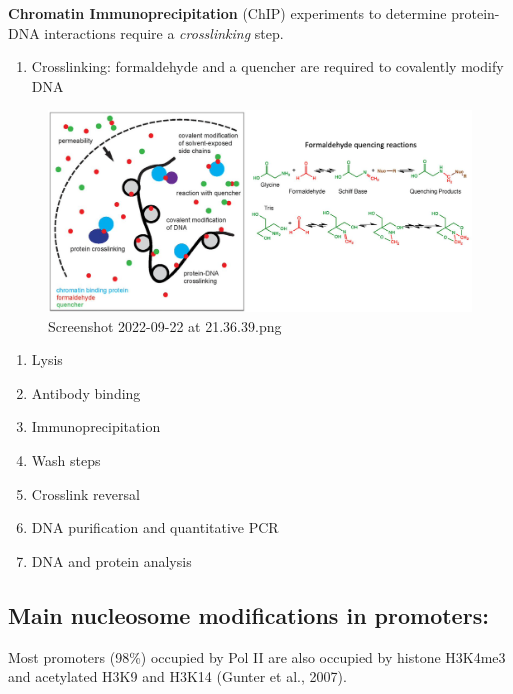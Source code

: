 \textbf{Chromatin Immunoprecipitation} (ChIP) experiments to determine protein-DNA interactions require a \emph{crosslinking} step.

\begin{enumerate}
\def\labelenumi{\arabic{enumi}.}
\tightlist
\item
  Crosslinking: formaldehyde and a quencher are required to covalently modify DNA
\end{enumerate}

\begin{figure}
\centering
\includegraphics[width=\textwidth]{../_resources/Screenshot_2022-09-22_at_21-36-39.png}
\caption{Screenshot 2022-09-22 at 21.36.39.png}
\end{figure}

\begin{enumerate}
\def\labelenumi{\arabic{enumi}.}
\tightlist
\item
  Lysis
\item
  Antibody binding
\item
  Immunoprecipitation
\item
  Wash steps
\item
  Crosslink reversal
\item
  DNA purification and quantitative PCR
\item
  DNA and protein analysis
\end{enumerate}

\hypertarget{main-nucleosome-modifications-in-promoters}{%
\subsection{Main nucleosome modifications in promoters:}\label{main-nucleosome-modifications-in-promoters}}

Most promoters (98\%) occupied by Pol II are also occupied by histone H3K4me3 and acetylated H3K9 and H3K14 (Gunter et al., 2007).


